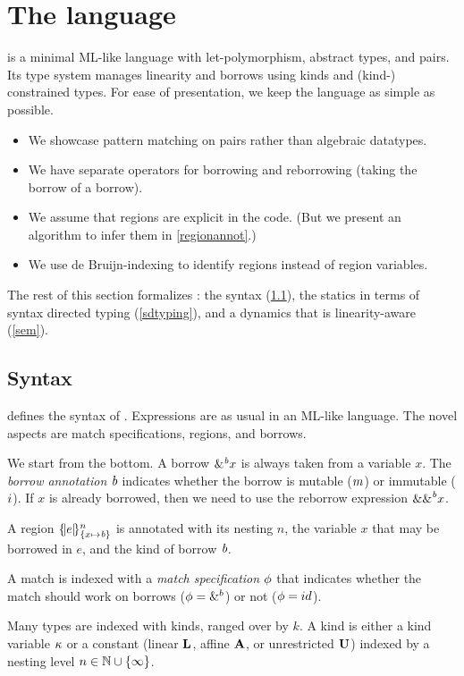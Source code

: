 \section{The \lang language}

\lang is a minimal ML-like language with
let-polymorphism, abstract types, and pairs. Its type system manages
linearity and borrows using kinds and (kind-) constrained types.
For ease of presentation, we keep the language as simple as possible.
\begin{itemize}
\item We showcase pattern matching on pairs rather than algebraic
  datatypes.
\item We have separate operators for borrowing and reborrowing (taking
  the borrow of a borrow).
\item We assume that regions are explicit in the code. (But we present
  an algorithm to infer them in \cref{regionannot}.)
\item We use de Bruijn-indexing to identify regions instead of region
  variables. 
\end{itemize}

The rest of this section formalizes  \lang: the syntax (\cref{syntax}),
the statics in terms of syntax directed typing (\cref{sdtyping}),
and a dynamics that is linearity-aware (\cref{sem}).

\subsection{Syntax}
\label{syntax}


 defines the syntax of \lang. Expressions are as usual
in an ML-like language.  The novel aspects are match
specifications, regions, and borrows.

We start from the bottom.
A borrow $\borrow{x}$ is always taken from a variable $x$. The
\emph{borrow annotation} $\BORROW$ indicates whether the borrow is mutable
($\MBORROW$) or immutable ($\IBORROW$). If $x$ is already borrowed,
then we need to use the reborrow expression $\reborrow{x}$.

A region $\region{\Sone x\BORROW}{e}$ is annotated with its nesting $n$, the variable $x$ that may be borrowed in $e$, and the kind of borrow $\BORROW$.

A match is indexed with a \emph{match specification} $\etransfm$ that indicates
whether the match should work on borrows ($\etransfm=\&^b$) or not ($\etransfm=id$).

Many types are indexed with kinds, ranged over by $k$.
A kind is either a kind variable $\kvar$ or a constant
(linear $\klin$, affine $\kaff$, or unrestricted $\kun$) indexed
by a nesting level $n \in \Nat \cup \{\infty\}$.

